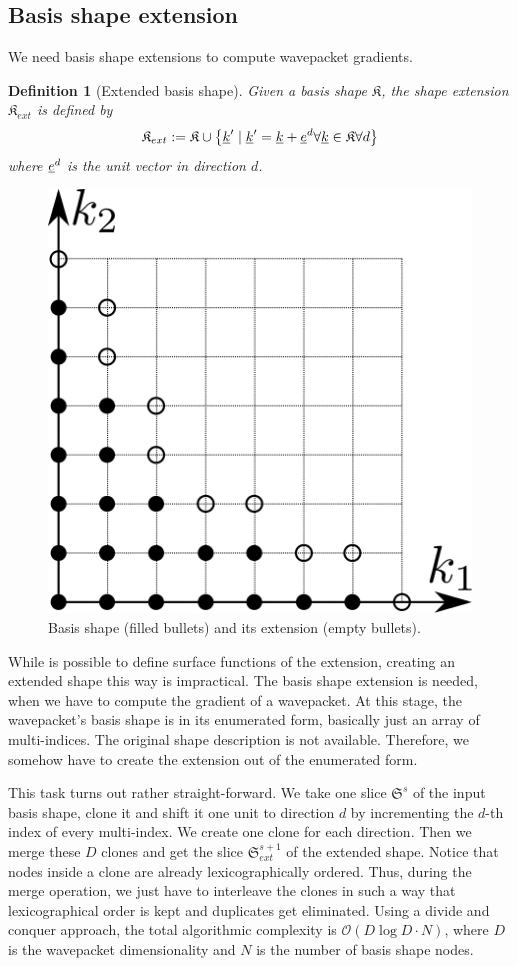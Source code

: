 \documentclass{article}
\newtheorem{definition}{Definition}
\begin{document}
\subsection{Basis shape extension}

We need basis shape extensions to compute wavepacket gradients.

\begin{definition}[Extended basis shape]
  Given a basis shape \( \mathfrak{K} \),
  the shape extension \( \mathfrak{K}_{ext} \) is defined by
  \begin{equation}
    \mathfrak{K}_{ext} := \mathfrak{K} \cup
    \left\{\underline{k}' \;|\; \underline{k}' = \underline{k} + \underline{e}^d
      \forall \underline{k} \in \mathfrak{K} \forall d\right\}
  \end{equation}
  where \( \underline{e}^d \) is the unit vector in direction \( d \).
\end{definition}

\begin{figure}[H]
  \begin{center}
    \includegraphics[width=0.5\linewidth]{shape_extension}
  \end{center}
  \caption{Basis shape (filled bullets) and its extension (empty
    bullets).}
\end{figure}

While is possible to define surface functions of the extension,
creating an extended shape this way is impractical.
The basis shape extension is needed, when
we have to compute the gradient of a wavepacket. At this stage,
the wavepacket's basis shape is in its enumerated form,
basically just an array of multi-indices. The original shape description is not available.
Therefore, we somehow have to create the extension out of the enumerated form.
\par
This task turns out rather straight-forward. We take one slice \(\mathfrak{S}^s\) of
the input basis shape, clone it and
shift it one unit to direction \(d\) by incrementing the \(d\)-th index of every multi-index.
We create one clone for each direction. Then we merge these \(D\) clones and get the
slice \(\mathfrak{S}_{ext}^{s+1}\) of the extended shape.
Notice that nodes inside a clone are already lexicographically ordered.
Thus, during the merge operation, we just have to interleave the clones in such a way that
lexicographical order is kept and duplicates get eliminated.
Using a divide and conquer approach, the total algorithmic complexity is
\(\mathcal{O}(D\log{}D \cdot N)\), where \(D\) is the wavepacket dimensionality and \(N\)
is the number of basis shape nodes.
\end{document}
